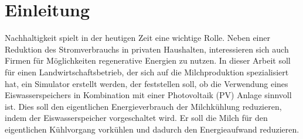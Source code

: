 \chapter{Einleitung}
Nachhaltigkeit spielt in der heutigen Zeit eine wichtige Rolle. Neben einer Reduktion des Stromverbrauchs in privaten Haushalten, interessieren sich auch Firmen für Möglichkeiten regenerative Energien zu nutzen. In dieser Arbeit soll für einen Landwirtschaftsbetrieb, der sich auf die Milchproduktion spezialisiert hat, ein Simulator erstellt werden, der feststellen soll, ob die Verwendung eines Eiswasserspeichers in Kombination mit einer Photovoltaik (PV) Anlage sinnvoll ist. Dies soll den eigentlichen Energieverbrauch der Milchkühlung reduzieren, indem der Eiswasserspeicher vorgeschaltet wird. Er soll die Milch für den eigentlichen Kühlvorgang vorkühlen und dadurch den Energieaufwand reduzieren.